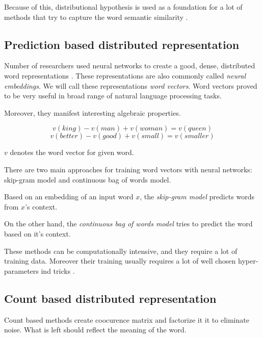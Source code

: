     Because of this, distributional hypothesis is used as a foundation for a lot of methods that try to capture the word semantic similarity \cite{rubenstein1965contextual}. 

    \subsection{Prediction based distributed representation}
    
    Number of researchers used neural networks to create a good, dense, distributed word representations \cite{pennington2014glove} \cite{DBLP:conf/icml/LeM14} \cite{rong2014word2vec}. %
    These representations are also commonly called \emph{neural embeddings}.
    We will call these representations \emph{word vectors}.
    Word vectors proved to be very useful in broad range of natural language processing tasks. 
    
    Moreover, they manifest interesting algebraic properties. 
    
    $$v(king) - v(man) + v(woman) = v(queen)$$
    $$v(better) - v(good) + v(small) = v(smaller)$$
    
    $v$ denotes the word vector for given word.
    
    There are two main approaches for training word vectors with neural networks: skip-gram model and continuous bag of words model.
    
    Based on an embedding of an input word $x$, the \textit{skip-gram model} predicts words from $x$'s context.
    
    On the other hand, the \textit{continuous bag of words model} tries to predict the word based on it's context.
    
    These methods can be computationally intensive, and they require a lot of training data. 
    Moreover their training usually requires a lot of well chosen hyper-parameters ind tricks \cite{DBLP:journals/corr/MikolovSCCD13}. %
    \* %
    

    \subsection{Count based distributed representation}
    \* %
    
    Count based methods create coocurence matrix and factorize it it to eliminate noise. 
    What is left should reflect the meaning of the word. 
    
